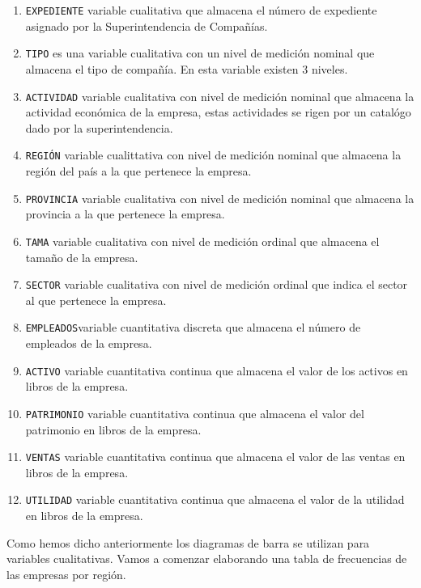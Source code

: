 \documentclass[letterpaper,]{book}
\providecommand{\tightlist}{%
  \setlength{\itemsep}{0pt}\setlength{\parskip}{0pt}}
\begin{document}
\begin{enumerate}
\def\labelenumi{\arabic{enumi}.}
\tightlist
\item
  \texttt{EXPEDIENTE} variable cualitativa que almacena el número de expediente asignado por la Superintendencia de Compañías.
\item
  \texttt{TIPO} es una variable cualitativa con un nivel de medición nominal que almacena el tipo de compañía. En esta variable existen 3 niveles.
\item
  \texttt{ACTIVIDAD} variable cualitativa con nivel de medición nominal que almacena la actividad económica de la empresa, estas actividades se rigen por un catalógo dado por la superintendencia.
\item
  \texttt{REGIÓN} variable cualittativa con nivel de medición nominal que almacena la región del país a la que pertenece la empresa.
\item
  \texttt{PROVINCIA} variable cualitativa con nivel de medición nominal que almacena la provincia a la que pertenece la empresa.
\item
  \texttt{TAMA} variable cualitativa con nivel de medición ordinal que almacena el tamaño de la empresa.
\item
  \texttt{SECTOR} variable cualitativa con nivel de medición ordinal que indica el sector al que pertenece la empresa.
\item
  \texttt{EMPLEADOS}variable cuantitativa discreta que almacena el número de empleados de la empresa.
\item
  \texttt{ACTIVO} variable cuantitativa continua que almacena el valor de los activos en libros de la empresa.
\item
  \texttt{PATRIMONIO} variable cuantitativa continua que almacena el valor del patrimonio en libros de la empresa.
\item
  \texttt{VENTAS} variable cuantitativa continua que almacena el valor de las ventas en libros de la empresa.
\item
  \texttt{UTILIDAD} variable cuantitativa continua que almacena el valor de la utilidad en libros de la empresa.
\end{enumerate}

Como hemos dicho anteriormente los diagramas de barra se utilizan para variables cualitativas. Vamos a comenzar elaborando una tabla de frecuencias de las empresas por región.
\end{document}
